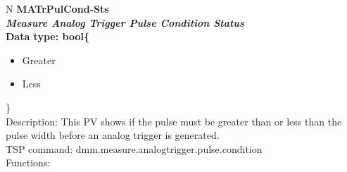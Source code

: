 \documentclass[openany]{article}
\begin{document}
		\begin{tabular}{N}
			\hline
			\bfseries MATrPulCond-Sts\label{pv:matrpulcond-sts} \\ \hline
			\emph{Measure Analog Trigger Pulse Condition Status} \\
			Data type: bool\{\begin{itemize}[noitemsep]
				\small
				\item[] Greater
				\item[] Less
			\end{itemize}\} \\
			Description: This PV shows if the pulse must be greater than or less than the pulse width before an analog trigger is generated. \\
			TSP command: dmm.measure.analogtrigger.pulse.condition \\
			Functions: \\
			\arrayrulecolor{\FuncTableBorderColor}

		\end{tabular}
\end{document}
